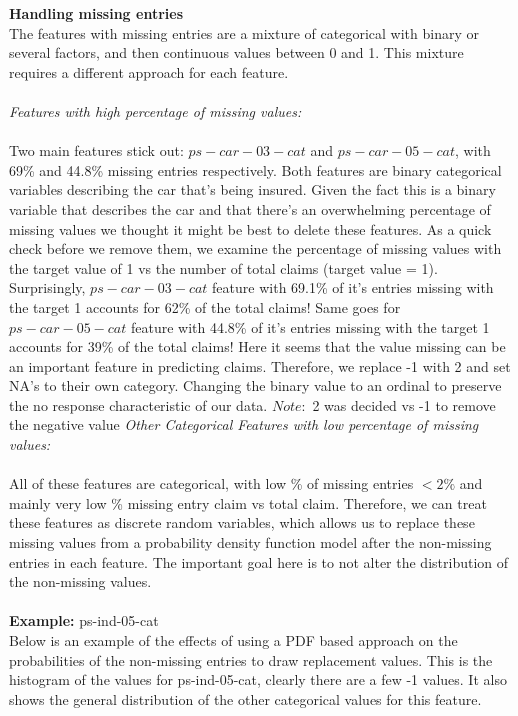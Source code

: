 \documentclass[fleqn,10pt]{SelfArx} %
\begin{document}
\newpage
\textbf{Handling missing entries}\\
The features with missing entries are a mixture of categorical with binary or several factors, and then continuous values between 0 and 1. This mixture requires a different approach for each feature.\\\\
\textit{Features with high percentage of missing values:}\\
\\
Two main features stick out: $ps-car-03-cat$ and $ps-car-05-cat$, with 69\% and 44.8\% missing entries respectively. Both features are binary categorical variables describing the car that's being insured. Given the fact this is a binary variable that describes the car and that there's an overwhelming percentage of missing values we thought it might be best to delete these features. As a quick check before we remove them, we examine the percentage of missing values with the target value of 1 vs the number of total claims (target value = 1). Surprisingly, $ps-car-03-cat$ feature with 69.1\% of it's entries missing with the target 1 accounts for 62\% of the total claims! Same goes for $ps-car-05-cat$  feature with 44.8\% of it's entries missing with the target 1 accounts for 39\% of the total claims! Here it seems that the value missing can be an important feature in predicting claims. Therefore, we replace -1 with 2 and set NA's to their own category. Changing the binary value to an ordinal to preserve the no response characteristic of our data. $Note:$ 2 was decided vs -1 to remove the negative value
\textit{Other Categorical Features with low percentage of missing values:}\\
\\
All of these features are categorical, with low \% of missing entries \(< 2\%\) and mainly very low \% missing entry claim vs total claim. Therefore, we can treat these features as discrete random variables, which allows us to replace these missing values from a probability density function model after the non-missing entries in each feature. The important goal here is to not alter the distribution of the non-missing values. \\
\\
\textbf{Example:} ps-ind-05-cat\\
Below is an example of the effects of using a PDF based approach on the probabilities of the non-missing entries to draw replacement values.
\newpage
This is the histogram of the values for ps-ind-05-cat, clearly there are a few -1 values. It also shows the general distribution of the other categorical values for this feature.\\ 
\end{document}
